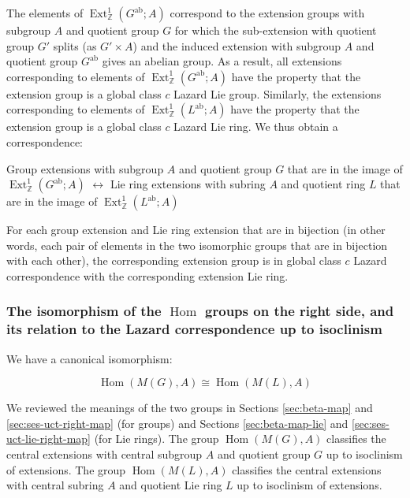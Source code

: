 \documentclass{ucetd}
\begin{document}
The elements of
$\operatorname{Ext}^1_{\mathbb{Z}}(G^{\operatorname{ab}};A)$
correspond to the extension groups with subgroup $A$ and quotient
group $G$ for which the sub-extension with quotient group $G'$ splits
(as $G' \times A$) and the induced extension with subgroup $A$ and
quotient group $G^{\operatorname{ab}}$ gives an abelian group. As a
result, all extensions corresponding to elements of
$\operatorname{Ext}^1_{\mathbb{Z}}(G^{\operatorname{ab}};A)$ have the
property that the extension group is a global class $c$ Lazard Lie
group. Similarly, the extensions corresponding to elements of
$\operatorname{Ext}^1_{\mathbb{Z}}(L^{\operatorname{ab}};A)$ have the
property that the extension group is a global class $c$ Lazard Lie
ring. We thus obtain a correspondence:

\begin{center}
Group extensions with subgroup $A$ and quotient group $G$ that are in
the image of
$\operatorname{Ext}^1_{\mathbb{Z}}(G^{\operatorname{ab}};A)$
$\leftrightarrow$ Lie ring extensions with subring $A$ and quotient
ring $L$ that are in the image of $\operatorname{Ext}^1_{\mathbb{Z}}(L^{\operatorname{ab}};A)$ 
\end{center}

For each group extension and Lie ring extension that are in bijection
(in other words, each pair of elements in the two isomorphic groups
that are in bijection with each other), the corresponding extension
group is in global class $c$ Lazard correspondence with the
corresponding extension Lie ring.

\subsubsection{The isomorphism of the $\operatorname{Hom}$ groups on the right side, and its relation to the Lazard correspondence up to isoclinism}\label{sec:glcuti-extensions-main}


We have a canonical isomorphism:

$$\operatorname{Hom}(M(G),A) \cong \operatorname{Hom}(M(L), A)$$

We reviewed the meanings of the two groups in Sections
\ref{sec:beta-map} and \ref{sec:ses-uct-right-map} (for groups) and
Sections \ref{sec:beta-map-lie} and \ref{sec:ses-uct-lie-right-map}
(for Lie rings). The group $\operatorname{Hom}(M(G),A)$
classifies the central extensions with central subgroup $A$ and
quotient group $G$ up to isoclinism of extensions. The group
$\operatorname{Hom}(M(L),A)$ classifies the central extensions
with central subring $A$ and quotient Lie ring $L$ up to isoclinism of
extensions.
\end{document}

